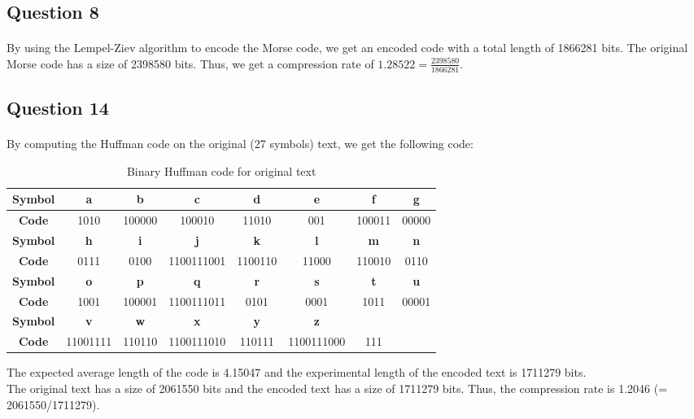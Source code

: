 \documentclass[a4paper, 11pt, oneside]{article}
\begin{document}

\subsection{Question 8}
\paragraph{}By using the Lempel-Ziev algorithm to encode the Morse code, we get an encoded code with a total length of 1866281 bits.
The original Morse code has a size of 2398580 bits. Thus, we get a compression rate of $1.28522 = \frac{2398580}{1866281}$.


\subsection{Question 14}
\paragraph{}By computing the Huffman code on the original (27 symbols) text, we get the following code:
\begin{table}[H]
    \centering
    \begin{tabular}{|c|c|c|c|c|c|c|c|}
    \hline
    \textbf{Symbol} & \textbf{a} & \textbf{b} & \textbf{c} & \textbf{d} & \textbf{e} & \textbf{f} & \textbf{g} \\ \hline
    \textbf{Code}   & 1010       & 100000     & 100010     & 11010      & 001        & 100011     & 00000      \\ \hline
    \textbf{Symbol} & \textbf{h} & \textbf{i} & \textbf{j} & \textbf{k} & \textbf{l} & \textbf{m} & \textbf{n} \\ \hline
    \textbf{Code}   & 0111       & 0100       & 1100111001 & 1100110    & 11000      & 110010     & 0110       \\ \hline
    \textbf{Symbol} & \textbf{o} & \textbf{p} & \textbf{q} & \textbf{r} & \textbf{s} & \textbf{t} & \textbf{u} \\ \hline
    \textbf{Code}   & 1001       & 100001     & 1100111011 & 0101       & 0001       & 1011       & 00001      \\ \hline
    \textbf{Symbol} & \textbf{v} & \textbf{w} & \textbf{x} & \textbf{y} & \textbf{z} & \textbf{}  & \textbf{}  \\ \hline
    \textbf{Code}   & 11001111   & 110110     & 1100111010 & 110111     & 1100111000 & 111        &            \\ \hline
    \end{tabular}
    \caption{Binary Huffman code for original text}
\end{table}
The expected average length of the code is 4.15047 and the experimental length of the encoded text is 1711279 bits.\\
The original text has a size of 2061550 bits and the encoded text has a size of 1711279 bits. Thus, the compression rate is 1.2046 (= 2061550/1711279).
\end{document}
